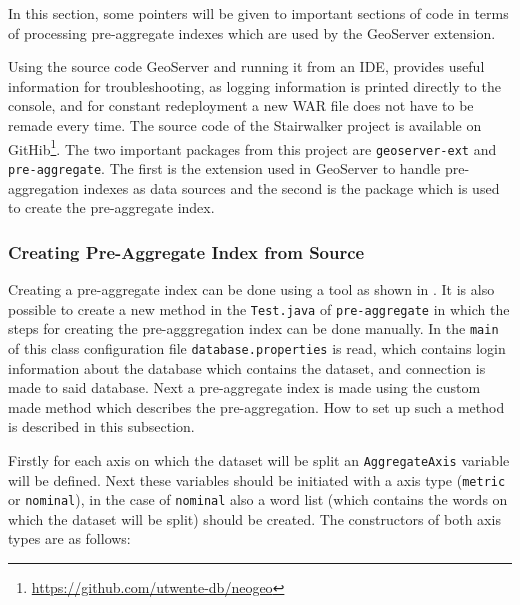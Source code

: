 In this section, some pointers will be given to important sections of code
in terms of processing pre-aggregate indexes which are used by the
GeoServer extension.

Using the source code GeoServer and running it from an IDE, provides useful
information for troubleshooting, as logging information is printed directly
to the console, and for constant redeployment a new WAR file does not have
to be remade every time. The source code of the Stairwalker project is
available on GitHib\footnote{\url{https://github.com/utwente-db/neogeo}}.
The two important packages from this project are \lstinline|geoserver-ext|
and \lstinline|pre-aggregate|. The first is the extension used in GeoServer
to handle pre-aggregation indexes as data sources and the second is the
package which is used to create the pre-aggregate index.

\subsubsection{Creating Pre-Aggregate Index from Source}


Creating a pre-aggregate index can be done using a tool as shown in
. It is also possible to create a new method in the
\lstinline|Test.java| of \lstinline|pre-aggregate| in which the steps for
creating the pre-agggregation index can be done manually. In the
\lstinline|main| of this class configuration file
\lstinline|database.properties| is read, which contains login information
about the database which contains the dataset, and connection is made to
said database. Next a pre-aggregate index is made using the custom made
method which describes the pre-aggregation. How to set up such a method is
described in this subsection.

Firstly for each axis on which the dataset will be split an
\lstinline|AggregateAxis| variable will be defined. Next these variables
should be initiated with a axis type (\lstinline|metric| or
\lstinline|nominal|), in the case of \lstinline|nominal| also a word list
(which contains the words on which the dataset will be split) should be
created. The constructors of both axis types are as follows:

